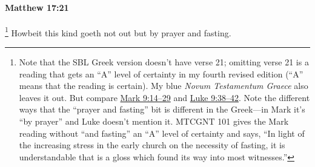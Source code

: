 			\begin{framed}
			\scriptsize
				\begin{compactdesc}
					\item[SBLG] 
				\end{compactdesc}
			\end{framed}

		\paragraph{Matthew 17:21} %
			\label{MATTHEW-17-21}

				\footnote{%
					Note that the SBL Greek version doesn't have verse 21; omitting verse 21 is a reading that gets an ``A'' level of certainty in my fourth revised edition (``A'' means that the reading is certain). My blue \textit{Novum Testamentum Graece} also leaves it out. But compare \hyperref[MARK-9-14]{Mark 9:14--29} and \hyperref[LUKE-9-38]{Luke 9:38--42}. Note the different ways that the ``prayer and fasting'' bit is different in the Greek---in Mark it's ``by prayer'' and Luke doesn't mention it. MTCGNT 101 gives the Mark reading without ``and fasting'' an ``A'' level of certainty and says, ``In light of the increasing stress in the early church on the necessity of fasting, it is understandable that  is a gloss which found its way into most witnesses.''
					}%
			Howbeit this kind goeth not out but by prayer and fasting.

